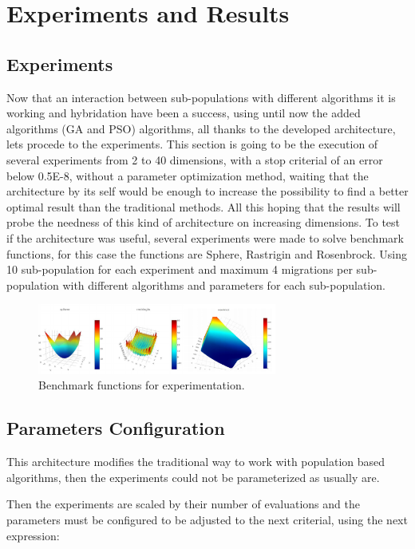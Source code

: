 \documentclass[runningheads]{llncs}
\begin{document}
\section{Experiments and Results}
\subsection{Experiments}
Now that an interaction between sub-populations with different algorithms it is
working and  hybridation have been a success, using until now the added
algorithms (GA and PSO) algorithms, all thanks to the developed architecture,
lets procede to the experiments. This section is going to be the execution of
several experiments from 2 to 40 dimensions, with a stop criterial of an error
below  0.5E-8, without a parameter optimization method, waiting that the
architecture by its self would be enough to increase the possibility to find a
better optimal result than the traditional methods. All this hoping that the
results will probe the needness of this kind of architecture on increasing
dimensions. To test if the architecture was useful, several experiments were
made to solve benchmark functions, for this case the functions are Sphere,
Rastrigin and Rosenbrock. Using 10 sub-population for each experiment and
maximum 4 migrations per sub-population with different algorithms and parameters
for each sub-population.

\begin{figure}[htp]
  \centering
    \includegraphics[width=0.7\textwidth]{img/benchmark.png}
    \caption{Benchmark functions for experimentation.} \label{fig1}
    \end{figure}

\subsection{Parameters Configuration} 

This architecture modifies the traditional way to work with population based
algorithms, then the experiments could not be parameterized as usually are.

Then the experiments are scaled by their number of evaluations and the
parameters must be configured to be adjusted to the next criterial, using the
next expression:
\end{document}
